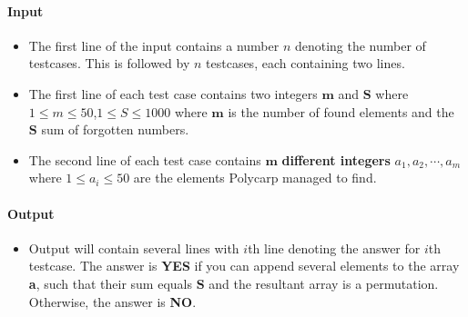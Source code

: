 \documentclass[a4paper]{exam}
\begin{document}
\begin{questions}
\begin{itemize}
    \end{itemize}


    \paragraph{Input}

    \begin{itemize}
        \item The first line of the input contains a number $n$ denoting the number of testcases. This is followed by $n$ testcases, each containing two lines.
        \item The first line of each test case contains two integers $\mathbf{m}$ and $\mathbf{S}$ where $ 1 \leq m \leq 50 $,$1 \leq S \leq 1000 $ where $\mathbf{m}$ is the number of found elements
              and the $\mathbf{S}$ sum of forgotten numbers.
        \item The second line of each test case contains $\mathbf{m}$ \textbf{different integers} $a_1,a_2, \cdots, a_m$ where $1 \leq a_i \leq 50$ are the elements Polycarp managed to find.
    \end{itemize}

    \paragraph{Output}
    \begin{itemize}
        \item Output will contain several lines with $i$th line denoting the answer for $i$th testcase. The answer is \textbf{YES} if you can append several elements to the array \textbf{a}, such that their sum equals $\mathbf{S}$ and the resultant array is a permutation. Otherwise, the answer is \textbf{NO}.
    \end{itemize}


\end{questions}
\end{document}
